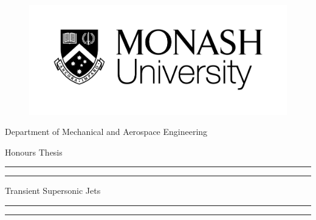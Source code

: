  

\begin{titlepage} %

	\centering %
	
	\scshape %
	
	\vspace*{1\baselineskip} %
	
	\begin{figure}[H] 
	 \centering
	 \includegraphics[scale=0.4]{monash_logo.jpg} 
    \end{figure}
    Department of Mechanical and Aerospace Engineering
    
    \vspace{2\baselineskip}
    
	{\Large Honours Thesis}
	

	\vspace{2cm}
	
	\rule{\textwidth}{1.6pt}\vspace*{-\baselineskip}\vspace*{2pt} %
	\rule{\textwidth}{0.4pt} %
	
	\vspace{1.5\baselineskip} %
	
	{\LARGE Transient Supersonic Jets} %
	
	\vspace{1.5\baselineskip} %
	
	\rule{\textwidth}{0.4pt}\vspace*{-\baselineskip}\vspace{3.2pt} %
	\rule{\textwidth}{1.6pt} %
	

\end{titlepage}
